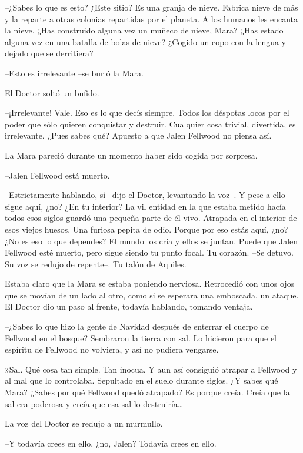 --¿Sabes lo que es esto? ¿Este sitio? Es una granja de nieve. Fabrica nieve de más y la reparte a otras colonias repartidas por el planeta. A los humanos les encanta la nieve. ¿Has construido alguna vez un muñeco de nieve, Mara? ¿Has estado alguna vez en una batalla de bolas de nieve? ¿Cogido un copo con la lengua y dejado que se derritiera?

--Esto es irrelevante --se burló la Mara.

El Doctor soltó un bufido.

--¡Irrelevante! Vale. Eso es lo que decís siempre. Todos los déspotas locos por el poder que sólo quieren conquistar y destruir. Cualquier cosa trivial, divertida, es irrelevante. ¿Pues sabes qué? Apuesto a que Jalen Fellwood no piensa así.

La Mara pareció durante un momento haber sido cogida por sorpresa.

--Jalen Fellwood está muerto.

--Estrictamente hablando, sí --dijo el Doctor, levantando la voz--. Y pese a ello sigue aquí, ¿no? ¿En tu interior? La vil entidad en la que estaba metido hacía todos esos siglos guardó una pequeña parte de él vivo. Atrapada en el interior de esos viejos huesos. Una furiosa pepita de odio. Porque por eso estás aquí, ¿no? ¿No es eso lo que dependes? El mundo los cría y ellos se juntan. Puede que Jalen Fellwood esté muerto, pero sigue siendo tu punto focal. Tu corazón. --Se detuvo. Su voz se redujo de repente--. Tu talón de Aquiles.

Estaba claro que la Mara se estaba poniendo nerviosa. Retrocedió con unos ojos que se movían de un lado al otro, como si se esperara una emboscada, un ataque. El Doctor dio un paso al frente, todavía hablando, tomando ventaja.

--¿Sabes lo que hizo la gente de Navidad después de enterrar el cuerpo de Fellwood en el bosque? Sembraron la tierra con sal. Lo hicieron para que el espíritu de Fellwood no volviera, y así no pudiera vengarse.

»Sal. Qué cosa tan simple. Tan inocua. Y aun así consiguió atrapar a Fellwood y al mal que lo controlaba. Sepultado en el suelo durante siglos. ¿Y sabes qué Mara? ¿Sabes por qué Fellwood quedó atrapado? Es porque creía. Creía que la sal era poderosa y creía que esa sal lo destruiría…

La voz del Doctor se redujo a un murmullo.

--Y todavía crees en ello, ¿no, Jalen? Todavía crees en ello.

